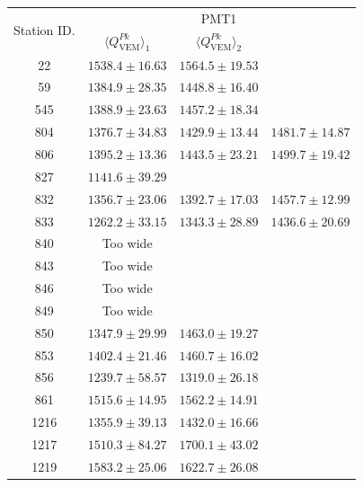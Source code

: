 \documentclass[aspectratio=169]{beamer}
\begin{document}

\begin{frame}
  \footnotesize
  \begin{tabular}{c|c|c|c} \hline
    \multirow{2}{*}{Station ID.} & \multicolumn{3}{c}{PMT1} \\
    \cline{2-4}
     & $\langle Q^{Pk}_{\mathrm{VEM}} \rangle_1$ & 
     $\langle Q^{Pk}_{\mathrm{VEM}} \rangle_2$ &  \\
     \cline{1-4}
     22   & $1538.4\pm16.63$ & $1564.5\pm19.53$ &
     \\ \hline
     59   & $1384.9\pm28.35$ & $1448.8\pm16.40$ & 
     \\ \hline
     545  & $1388.9\pm23.63$ & $1457.2\pm18.34$ & 
     \\ \hline
     804  & $1376.7\pm34.83$ & $1429.9\pm13.44$ &
     $1481.7\pm14.87$ 
     \\ \hline
     806  & $1395.2\pm13.36$ & $1443.5\pm23.21$ &
     $1499.7\pm19.42$ 
     \\ \hline
     827  & $1141.6\pm39.29$ & & 
     \\ \hline
     832  & $1356.7\pm23.06$ & $1392.7\pm17.03$ & 
     $1457.7\pm12.99$
     \\ \hline
     833  & $1262.2\pm33.15$ & $1343.3\pm28.89$ & 
     $1436.6\pm20.69$ 
     \\ \hline
     840  & Too wide & & 
     \\ \hline
     843  & Too wide & & 
     \\ \hline
     846  & Too wide & &
     \\ \hline
     849  & Too wide & &
     \\ \hline
     850  & $1347.9\pm29.99$ & $1463.0\pm19.27$ &
     \\ \hline
     853  & $1402.4\pm21.46$ & $1460.7\pm16.02$ &
     \\ \hline
     856  & $1239.7\pm58.57$ & $1319.0\pm26.18$ &
     \\ \hline
     861  & $1515.6\pm14.95$ & $1562.2\pm14.91$ &
     \\ \hline
     1216 & $1355.9\pm39.13$ & $1432.0\pm16.66$ & 
     \\ \hline
     1217 & $1510.3\pm84.27$ & $1700.1\pm43.02$ & 
     \\ \hline
     1219 & $1583.2\pm25.06$ & $1622.7\pm26.08$ &
     \\ \hline
  \end{tabular}
\end{frame}
\end{document}
